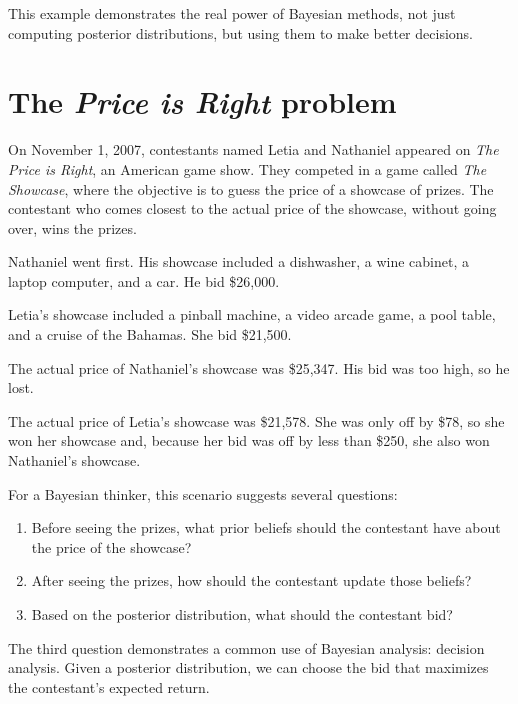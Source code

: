 \documentclass[12pt]{book}
\theoremstyle{exercise}
\begin{document}
This example demonstrates the real power of Bayesian methods, not just computing posterior distributions, but using them to make better decisions.


\section{The {\it Price is Right} problem}

On November 1, 2007, contestants named Letia and Nathaniel appeared
on {\it The Price is Right}, an American game show.  They competed in
a game called {\it The Showcase}, where the objective is to guess the price
of a showcase of prizes.  The contestant who comes closest to the
actual price of the showcase, without going over, wins the prizes.


Nathaniel went first.  His showcase included a dishwasher, a wine
cabinet, a laptop computer, and a car.  He bid \$26,000.

Letia's showcase included a pinball machine, a video arcade game, a
pool table, and a cruise of the Bahamas.  She bid \$21,500.

The actual price of Nathaniel's showcase was \$25,347.  His bid
was too high, so he lost.

The actual price of Letia's showcase was \$21,578.  She was only
off by \$78, so she won her showcase and, because
her bid was off by less than \$250, she also won Nathaniel's
showcase.

For a Bayesian thinker, this scenario suggests several questions:

\begin{enumerate}

\item Before seeing the prizes, what prior beliefs should the
  contestant have about the price of the showcase?

\item After seeing the prizes, how should the contestant update
  those beliefs?

\item Based on the posterior distribution, what should the
  contestant bid?

\end{enumerate}

The third question demonstrates a common use of Bayesian analysis:
decision analysis.  Given a posterior distribution, we can choose
the bid that maximizes the contestant's expected return.
\end{document}
